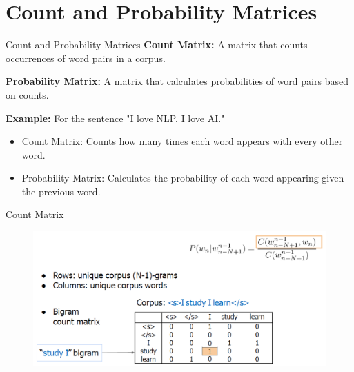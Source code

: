 \section{Count and Probability Matrices}
\begin{frame}{Count and Probability Matrices}
    \textbf{Count Matrix:} A matrix that counts occurrences of word pairs in a corpus.
    
    \vspace{1em}
    \textbf{Probability Matrix:} A matrix that calculates probabilities of word pairs based on counts.
    
    \vspace{1em}
    \textbf{Example:} For the sentence "I love NLP. I love AI."
    \begin{itemize}
        \item Count Matrix: Counts how many times each word appears with every other word.
        \item Probability Matrix: Calculates the probability of each word appearing given the previous word.
    \end{itemize}
\end{frame}

\begin{frame}{Count Matrix}
    \begin{figure}
        \centering
        \includegraphics[height=0.8\textheight,width=1\textwidth,keepaspectratio]{images/nlp-intro/count-matrix.png}
    \end{figure}
\end{frame}

